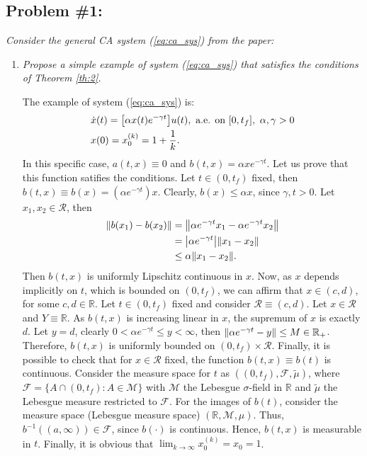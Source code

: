 \documentclass[11pt,letterpaper]{article}
\newcommand{\RR}{{\mathbb{R}}}
\newcommand{\M}{{\mathcal{M}}}
\newcommand{\F}{{\mathcal{F}}}
\newcommand{\R}{{\mathcal{R}}}
\let\originalleft\left
\let\originalright\right
\renewcommand{\left}{\mathopen{}\mathclose\bgroup\originalleft}
\renewcommand{\right}{\aftergroup\egroup\originalright}
\newcommand{\norm}[1]{\left\lVert#1\right\rVert}
\theoremstyle{definition}
\begin{document}
\subsection*{Problem \#1:}
\textit{
Consider the general CA system (\ref{eq:ca_sys}) from the paper:}
\begin{enumerate}[label=\alph*)]
    \item \textit{Propose a simple example of system (\ref{eq:ca_sys}) that satisfies the conditions of Theorem \ref{th:2}.}
    
    The example of system (\ref{eq:ca_sys}) is:
    \begin{equation}\label{eq:ex_ca}
    \begin{split}
    &\dot{x}(t)=\left[\alpha x(t)e^{-\gamma t}\right]u(t), \ \text{a.e. on } [0, t_f],\ \alpha,\gamma>0\\
    &x(0)=x_0^{(k)}=1+\dfrac{1}{k}.
    \end{split}
    \end{equation}
    In this specific case, $a(t,x)\equiv 0$ and $b(t,x)=\alpha xe^{-\gamma t}$. Let us prove that this function satifies the conditions. Let $t\in(0,t_f)$ fixed, then $b(t,x)\equiv b(x)=(\alpha e^{-\gamma t})x$. Clearly, $b(x)\leq\alpha x$, since $\gamma,t>0$. Let $x_1,x_2\in\R$, then 
    \[
    \begin{split}
        \norm{b(x_1)-b(x_2)}&=\norm{\alpha e^{-\gamma t}x_1 - \alpha e^{-\gamma t}x_2}\\
        &=\left|\alpha e^{-\gamma t}\right|\norm{x_1-x_2}\\
        &\leq \alpha\norm{x_1-x_2}.
    \end{split}
    \]
    Then $b(t,x)$ is uniformly Lipschitz continuous in $x$. Now, as $x$ depends implicitly on $t$, which is bounded on $(0,t_f)$, we can affirm that $x\in(c,d)$, for some $c,d\in\RR$. Let $t\in(0,t_f)$ fixed and consider $\R\equiv(c,d)$. Let $x\in \R$ and $Y\equiv\RR$. As $b(t,x)$ is increasing linear in $x$, the supremum of $x$ is exactly $d$. Let $y=d$, clearly $0<\alpha e^{-\gamma t}\leq y<\infty$, then $\norm{\alpha e^{-\gamma t} - y}\leq M\in\RR_+$. Therefore, $b(t,x)$ is uniformly bounded on $(0,t_f)\times\R$. Finally, it is possible to check that for $x\in\R$ fixed, the function $b(t,x)\equiv b(t)$ is continuous. Consider the measure space for $t$ as $((0,t_f),\F,\tilde{\mu})$, where $\F=\{A\cap(0,t_f):A\in\M\}$ with $\M$ the Lebesgue $\sigma$-field in $\RR$ and $\tilde{\mu}$ the Lebesgue measure restricted to $\F$. For the images of $b(t)$, consider the measure space (Lebesgue measure space) $(\RR,\M,\mu)$. Thus, $b^{-1}((a,\infty))\in\F$, since $b(\cdot)$ is continuous. Hence, $b(t,x)$ is measurable in $t$. Finally, it is obvious that $\lim_{k\rightarrow\infty}x_0^{(k)}=x_0=1$.
    

\end{enumerate}
\end{document}
